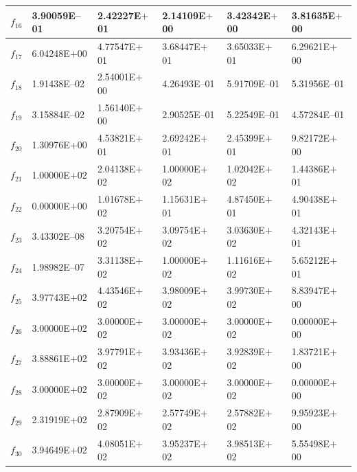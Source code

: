 \documentclass{svproc}
\begin{document}
\begin{table}[!ht]
{\begin{tabular}{p{0.5cm}p{2.1cm}p{2.1cm}p{2.1cm}p{2.1cm}p{2.1cm}}
		$f_{16}$ & 3.90059E--01 & 2.42227E$+$01 & 2.14109E$+$00 & 3.42342E$+$00 & 3.81635E$+$00 \\ \hline
		$f_{17}$ & 6.04248E$+$00 & 4.77547E$+$01 & 3.68447E$+$01 & 3.65033E$+$01 & 6.29621E$+$00 \\ \hline
		$f_{18}$ & 1.91438E--02 & 2.54001E$+$00 & 4.26493E--01 & 5.91709E--01 & 5.31956E--01 \\ \hline
		$f_{19}$ & 3.15884E--02 & 1.56140E$+$00 & 2.90525E--01 & 5.22549E--01 & 4.57284E--01 \\ \hline
		$f_{20}$ & 1.30976E$+$00 & 4.53821E$+$01 & 2.69242E$+$01 & 2.45399E$+$01 & 9.82172E$+$00 \\ \hline
		$f_{21}$ & 1.00000E$+$02 & 2.04138E$+$02 & 1.00000E$+$02 & 1.02042E$+$02 & 1.44386E$+$01 \\ \hline
		$f_{22}$ & 0.00000E$+$00 & 1.01678E$+$02 & 1.15631E$+$01 & 4.87450E$+$01 & 4.90438E$+$01 \\ \hline
		$f_{23}$ & 3.43302E--08 & 3.20754E$+$02 & 3.09754E$+$02 & 3.03630E$+$02 & 4.32143E$+$01 \\ \hline
		$f_{24}$ & 1.98982E--07 & 3.31138E$+$02 & 1.00000E$+$02 & 1.11616E$+$02 & 5.65212E$+$01 \\ \hline
		$f_{25}$ & 3.97743E$+$02 & 4.43546E$+$02 & 3.98009E$+$02 & 3.99730E$+$02 & 8.83947E$+$00 \\ \hline
		$f_{26}$ & 3.00000E$+$02 & 3.00000E$+$02 & 3.00000E$+$02 & 3.00000E$+$02 & 0.00000E$+$00 \\ \hline
		$f_{27}$ & 3.88861E$+$02 & 3.97791E$+$02 & 3.93436E$+$02 & 3.92839E$+$02 & 1.83721E$+$00 \\ \hline
		$f_{28}$ & 3.00000E$+$02 & 3.00000E$+$02 & 3.00000E$+$02 & 3.00000E$+$02 & 0.00000E$+$00 \\ \hline
		$f_{29}$ & 2.31919E$+$02 & 2.87909E$+$02 & 2.57749E$+$02 & 2.57882E$+$02 & 9.95923E$+$00 \\ \hline
		$f_{30}$ & 3.94649E$+$02 & 4.08051E$+$02 & 3.95237E$+$02 & 3.98513E$+$02 & 5.55498E$+$00 \\ \hline
	\end{tabular}
}
\end{table}
\end{document}
